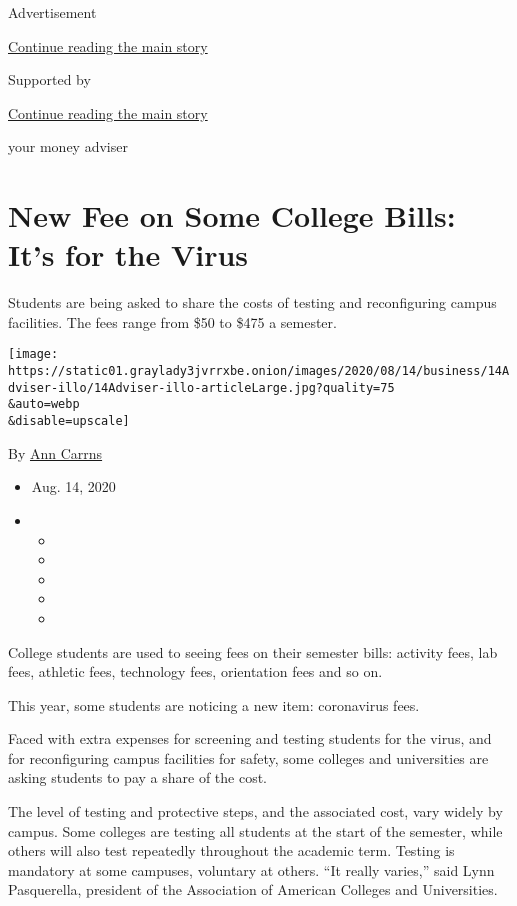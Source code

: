 Advertisement

\protect\hyperlink{after-top}{Continue reading the main story}

Supported by

\protect\hyperlink{after-sponsor}{Continue reading the main story}

your money adviser

\hypertarget{new-fee-on-some-college-bills-its-for-the-virus}{%
\section{New Fee on Some College Bills: It's for the
Virus}\label{new-fee-on-some-college-bills-its-for-the-virus}}

Students are being asked to share the costs of testing and reconfiguring
campus facilities. The fees range from \$50 to \$475 a semester.

\texttt{[image: https://static01.graylady3jvrrxbe.onion/images/2020/08/14/business/14Adviser-illo/14Adviser-illo-articleLarge.jpg?quality=75\\\&auto=webp\\\&disable=upscale]}

By \href{https://www.nytimes3xbfgragh.onion/by/ann-carrns}{Ann Carrns}

\begin{itemize}
\item
  Aug. 14, 2020
\item
  \begin{itemize}
  \item
  \item
  \item
  \item
  \item
  \end{itemize}
\end{itemize}

College students are used to seeing fees on their semester bills:
activity fees, lab fees, athletic fees, technology fees, orientation
fees and so on.

This year, some students are noticing a new item: coronavirus fees.

Faced with extra expenses for screening and testing students for the
virus, and for reconfiguring campus facilities for safety, some colleges
and universities are asking students to pay a share of the cost.

The level of testing and protective steps, and the associated cost, vary
widely by campus. Some colleges are testing all students at the start of
the semester, while others will also test repeatedly throughout the
academic term. Testing is mandatory at some campuses, voluntary at
others. ``It really varies,'' said Lynn Pasquerella, president of the
Association of American Colleges and Universities.

